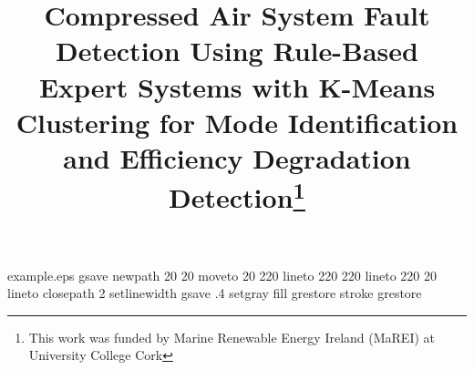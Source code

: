 %
%
%
%
%
\begin{filecontents*}{example.eps}
gsave
newpath
  20 20 moveto
  20 220 lineto
  220 220 lineto
  220 20 lineto
closepath
2 setlinewidth
gsave
  .4 setgray fill
grestore
stroke
grestore
\end{filecontents*}
%
\RequirePackage{fix-cm}
%
\documentclass[twocolumn]{svjour3}          %
%
\smartqed  %
%
\usepackage{graphicx}
%
\usepackage{mathptmx}      %
%
%
\usepackage{natbib} %
\usepackage{hyperref}



\usepackage{booktabs}
\usepackage{multirow}
\usepackage{tabularx}
\usepackage{longtable}
\usepackage{lipsum}
\usepackage{lscape}
\usepackage{siunitx}
\usepackage{amsmath}
\usepackage{rotating}
%
%


\title{Compressed Air System Fault Detection Using Rule-Based Expert Systems with K-Means Clustering for Mode Identification and Efficiency Degradation Detection\thanks{This work was funded by Marine Renewable Energy Ireland (MaREI) at University College Cork}
}

